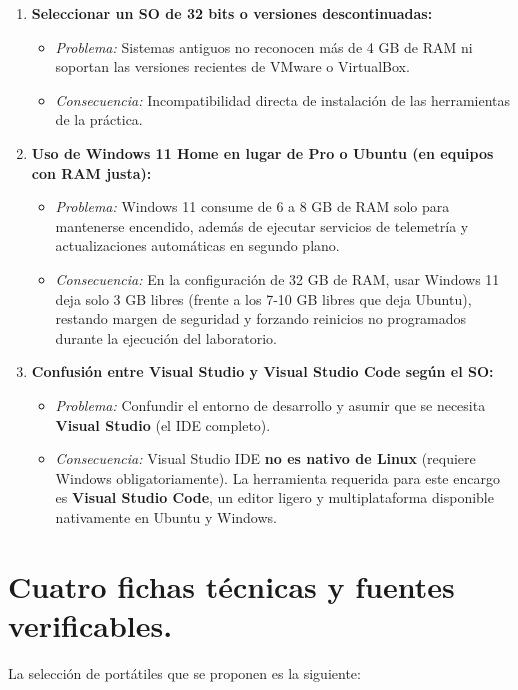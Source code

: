 \documentclass[11.5pt]{article}
\begin{document}
	\begin{enumerate}
		\item \textbf{Seleccionar un SO de 32 bits o versiones descontinuadas:}
		\begin{itemize}
			\item \textit{Problema:} Sistemas antiguos no reconocen más de 4 GB de RAM ni soportan las versiones recientes de VMware o VirtualBox.
			\item \textit{Consecuencia:} Incompatibilidad directa de instalación de las herramientas de la práctica.
		\end{itemize}
		
		\item \textbf{Uso de Windows 11 Home en lugar de Pro o Ubuntu (en equipos con RAM justa):}
		\begin{itemize}
			\item \textit{Problema:} Windows 11 consume de 6 a 8 GB de RAM solo para mantenerse encendido, además de ejecutar servicios de telemetría y actualizaciones automáticas en segundo plano.
			\item \textit{Consecuencia:} En la configuración de 32 GB de RAM, usar Windows 11 deja solo 3 GB libres (frente a los 7-10 GB libres que deja Ubuntu), restando margen de seguridad y forzando reinicios no programados durante la ejecución del laboratorio.
		\end{itemize}
		
		\item \textbf{Confusión entre Visual Studio y Visual Studio Code según el SO:}
		\begin{itemize}
			\item \textit{Problema:} Confundir el entorno de desarrollo y asumir que se necesita \textbf{Visual Studio} (el IDE completo).
			\item \textit{Consecuencia:} Visual Studio IDE \textbf{no es nativo de Linux} (requiere Windows obligatoriamente). La herramienta requerida para este encargo es \textbf{Visual Studio Code}, un editor ligero y multiplataforma disponible nativamente en Ubuntu y Windows.
		\end{itemize}
	\end{enumerate}
	
	
	
	\section{Cuatro fichas técnicas y fuentes verificables.}
	
	La selección de portátiles que se proponen es la siguiente:
	
\end{document}
